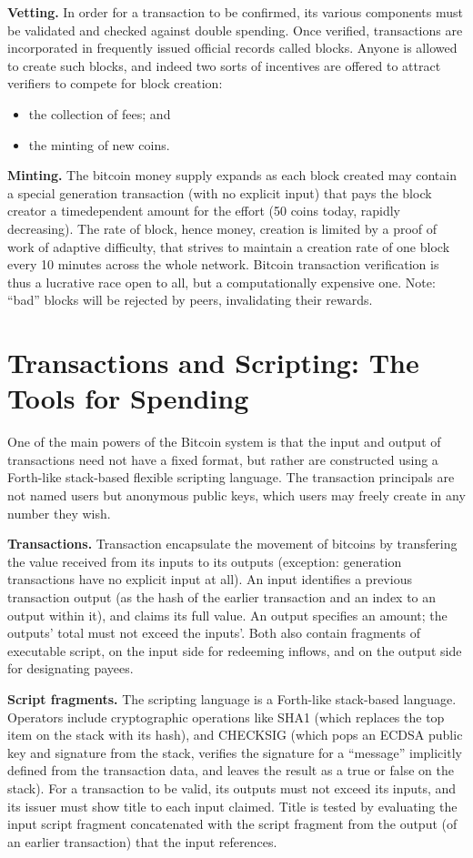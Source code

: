 \textbf{Vetting.} In order for a transaction to be confirmed, its various components must be
validated and checked against double spending. Once verified, transactions are incorporated
in frequently issued official records called blocks. Anyone is allowed to create
such blocks, and indeed two sorts of incentives are offered to attract verifiers to compete
for block creation: 
\begin{itemize}
	\item the collection of fees; and 
	\item the minting of new coins.
\end{itemize}

\textbf{Minting.} The bitcoin money supply expands as each block created may contain a special
generation transaction (with no explicit input) that pays the block creator a timedependent
amount for the effort (50 coins today, rapidly decreasing). The rate of block,
hence money, creation is limited by a proof of work of adaptive difficulty, that strives to
maintain a creation rate of one block every 10 minutes across the whole network. Bitcoin
transaction verification is thus a lucrative race open to all, but a computationally
expensive one. Note: “bad” blocks will be rejected by peers, invalidating their rewards.

\section{Transactions and Scripting: The Tools for Spending}
One of the main powers of the Bitcoin system is that the input and output of transactions
need not have a fixed format, but rather are constructed using a Forth-like stack-based
flexible scripting language. The transaction principals are not named users
but anonymous public keys, which users may freely create in any number they wish.

\textbf{Transactions.} Transaction encapsulate the movement of bitcoins by transfering the
value received from its inputs to its outputs (exception: generation transactions have
no explicit input at all). An input identifies a previous transaction output (as the hash
of the earlier transaction and an index to an output within it), and claims its full value.
An output specifies an amount; the outputs’ total must not exceed the inputs’. Both also
contain fragments of executable script, on the input side for redeeming inflows, and on
the output side for designating payees.

\textbf{Script fragments.} The scripting language is a Forth-like stack-based language. Operators
include cryptographic operations like SHA1 (which replaces the top item on the
stack with its hash), and CHECKSIG (which pops an ECDSA public key and signature
from the stack, verifies the signature for a “message” implicitly defined from the transaction
data, and leaves the result as a true or false on the stack). For a transaction to be
valid, its outputs must not exceed its inputs, and its issuer must show title to each input
claimed. Title is tested by evaluating the input script fragment concatenated with the
script fragment from the output (of an earlier transaction) that the input references.

